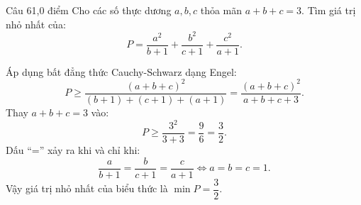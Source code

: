 \begin{de_cau}{Câu 6}{1,0 điểm}
Cho các số thực dương $a, b, c$ thỏa mãn $a + b + c = 3$. Tìm giá trị nhỏ nhất của:
\[P = \dfrac{a^2}{b+1} + \dfrac{b^2}{c+1} + \dfrac{c^2}{a+1}.\]
\end{de_cau}

\begin{loi_giai_cau}
Áp dụng bất đẳng thức Cauchy-Schwarz dạng Engel:
\[P \ge \frac{(a+b+c)^2}{(b+1) + (c+1) + (a+1)} = \frac{(a+b+c)^2}{a+b+c+3}.\]
Thay $a+b+c = 3$ vào:
\[P \ge \frac{3^2}{3 + 3} = \frac{9}{6} = \frac{3}{2}.\]
Dấu ``='' xảy ra khi và chỉ khi:
\[\frac{a}{b+1} = \frac{b}{c+1} = \frac{c}{a+1} \iff a = b = c = 1.\]
Vậy giá trị nhỏ nhất của biểu thức là $\boxed{\min P = \dfrac{3}{2}}$.
\end{loi_giai_cau}

